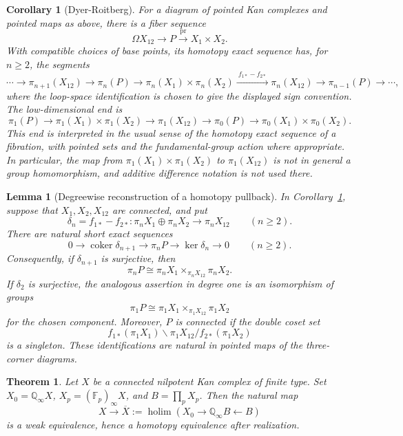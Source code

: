 \documentclass[10pt,a4paper]{amsart}
\newtheorem{corollary}{Corollary}
\newtheorem{lemma}{Lemma}
\newtheorem{theorem}{Theorem}
\begin{document}
\begin{corollary}[Dyer-Roitberg]\label{dr}
For a diagram of pointed Kan complexes and pointed maps as above, there
is a fiber sequence
\[
 \Omega X_{12}\longrightarrow P
 \xrightarrow{\operatorname{pr}}X_1\times X_2.
\]
With compatible choices of base points, its homotopy exact sequence has,
for $n\geq2$, the segments
\[
 \cdots\longrightarrow\pi_{n+1}(X_{12})
 \longrightarrow\pi_n(P)
 \longrightarrow\pi_n(X_1)\times\pi_n(X_2)
 \xrightarrow{\ f_{1*}-f_{2*}\ }\pi_n(X_{12})
 \longrightarrow\pi_{n-1}(P)\longrightarrow\cdots,
\]
where the loop-space identification is chosen to give the displayed
sign convention.  The low-dimensional end is
\[
 \pi_1(P)\longrightarrow\pi_1(X_1)\times\pi_1(X_2)
 \longrightarrow\pi_1(X_{12})\longrightarrow\pi_0(P)
 \longrightarrow\pi_0(X_1)\times\pi_0(X_2).
\]
This end is interpreted in the usual sense of the homotopy exact
sequence of a fibration, with pointed sets and the fundamental-group
action where appropriate.  In particular, the map from
$\pi_1(X_1)\times\pi_1(X_2)$ to $\pi_1(X_{12})$ is not in general a
group homomorphism, and additive difference notation is not used there.
\end{corollary}

\begin{lemma}[Degreewise reconstruction of a homotopy pullback]
\label{degreewise-pullback}
In Corollary~\ref{dr}, suppose that $X_1,X_2,X_{12}$ are connected,
and put
\[
 \delta_n=f_{1*}-f_{2*}:\pi_nX_1\oplus\pi_nX_2\longrightarrow\pi_nX_{12}
 \qquad(n\geq2).
\]
There are natural short exact sequences
\[
 0\longrightarrow\operatorname{coker}\delta_{n+1}
 \longrightarrow\pi_nP\longrightarrow\ker\delta_n
 \longrightarrow0\qquad(n\geq2).
\]
Consequently, if $\delta_{n+1}$ is surjective, then
\[
 \pi_nP\cong\pi_nX_1\times_{\pi_nX_{12}}\pi_nX_2.
\]
If $\delta_2$ is surjective, the analogous assertion in degree one is
an isomorphism of groups
\[
 \pi_1P\cong\pi_1X_1\times_{\pi_1X_{12}}\pi_1X_2
\]
for the chosen component.  Moreover, $P$ is connected if the double
coset set
\[
 f_{1*}(\pi_1X_1)\backslash\pi_1X_{12}/f_{2*}(\pi_1X_2)
\]
is a singleton.  These identifications are natural in pointed maps
of the three-corner diagrams.
\end{lemma}

\begin{theorem}\label{space-arithmetic}
Let $X$ be a connected nilpotent Kan complex of finite type.  Set
$X_0=\mathbb Q_\infty X$, $X_p=(\mathbb F_p)_\infty X$, and
$B=\prod_pX_p$.  Then the natural map
\[
 X\longrightarrow\overline X
 :=\operatorname{holim}(X_0\longrightarrow\mathbb Q_\infty B
 \longleftarrow B)
\]
is a weak equivalence, hence a homotopy equivalence after realization.
\end{theorem}
\end{document}
